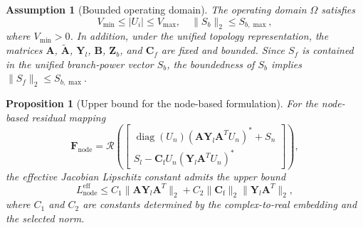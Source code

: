 \documentclass[journal]{IEEEtran}
\newtheorem{proposition}{Proposition}
\newtheorem{assumption}{Assumption}
\begin{document}
\begin{assumption}[Bounded operating domain]
\label{assump:bounded}
The operating domain $\Omega$ satisfies
\begin{equation}
V_{\min}\leq |U_i|\leq V_{\max},\quad
\|S_b\|_2\leq S_{b,\max},
\end{equation}
where $V_{\min}>0$. In addition, under the unified topology representation, the matrices $\mathbf{A}$, $\tilde{\mathbf{A}}$, $\mathbf{Y}_l$, $\mathbf{B}$, $\mathbf{Z}_b$, and $\mathbf{C}_f$ are fixed and bounded. Since $S_f$ is contained in the unified branch-power vector $S_b$, the boundedness of $S_b$ implies $\|S_f\|_2\leq S_{b,\max}$.
\end{assumption}

\begin{proposition}[Upper bound for the node-based formulation]
\label{prop:nodal_bound}
For the node-based residual mapping
\begin{equation}
\mathbf{F}_{\mathrm{node}}
=
\mathcal{R}
\left(
\begin{bmatrix}
\operatorname{diag}(U_n)(\mathbf{A}\mathbf{Y}_l\mathbf{A}^TU_n)^*+S_n\\
S_l-\mathbf{C}_{\mathrm{f}}U_n(\mathbf{Y}_l\mathbf{A}^TU_n)^*
\end{bmatrix}
\right),
\end{equation}
the effective Jacobian Lipschitz constant admits the upper bound
\begin{equation}
L_{\mathrm{node}}^{\mathrm{eff}}
\leq C_1\|\mathbf{A}\mathbf{Y}_l\mathbf{A}^T\|_2
+ C_2\|\mathbf{C}_{\mathrm{f}}\|_2\|\mathbf{Y}_l\mathbf{A}^T\|_2,
\end{equation}
where $C_1$ and $C_2$ are constants determined by the complex-to-real embedding and the selected norm.
\end{proposition}
\end{document}
